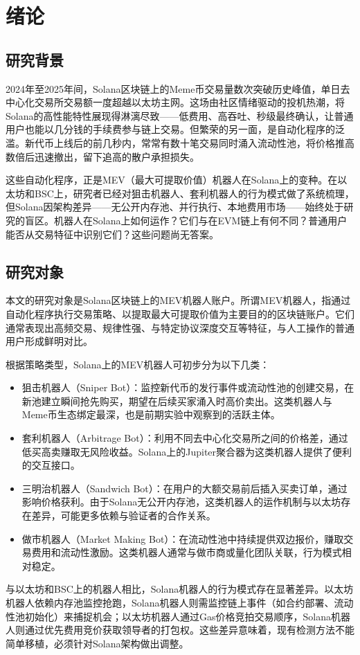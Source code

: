 \section{绪论}

\subsection{研究背景}

\par 2024年至2025年间，Solana区块链上的Meme币交易量数次突破历史峰值，单日去中心化交易所交易额一度超越以太坊主网。这场由社区情绪驱动的投机热潮，将Solana的高性能特性展现得淋漓尽致——低费用、高吞吐、秒级最终确认，让普通用户也能以几分钱的手续费参与链上交易。但繁荣的另一面，是自动化程序的泛滥。新代币上线后的前几秒内，常常有数十笔交易同时涌入流动性池，将价格推高数倍后迅速撤出，留下追高的散户承担损失。
\par 这些自动化程序，正是MEV（最大可提取价值）机器人在Solana上的变种。在以太坊和BSC上，研究者已经对狙击机器人、套利机器人的行为模式做了系统梳理，但Solana因架构差异——无公开内存池、并行执行、本地费用市场——始终处于研究的盲区。机器人在Solana上如何运作？它们与在EVM链上有何不同？普通用户能否从交易特征中识别它们？这些问题尚无答案。

\subsection{研究对象}

\par 本文的研究对象是Solana区块链上的MEV机器人账户。所谓MEV机器人，指通过自动化程序执行交易策略、以提取最大可提取价值为主要目的的区块链账户。它们通常表现出高频交易、规律性强、与特定协议深度交互等特征，与人工操作的普通用户形成鲜明对比。
\par 根据策略类型，Solana上的MEV机器人可初步分为以下几类：
\begin{itemize}
    \item 狙击机器人（Sniper Bot）：监控新代币的发行事件或流动性池的创建交易，在新池建立瞬间抢先购买，期望在后续买家涌入时高价卖出。这类机器人与Meme币生态绑定最深，也是前期实验中观察到的活跃主体。
    \item 套利机器人（Arbitrage Bot）：利用不同去中心化交易所之间的价格差，通过低买高卖赚取无风险收益。Solana上的Jupiter聚合器为这类机器人提供了便利的交互接口。
    \item 三明治机器人（Sandwich Bot）：在用户的大额交易前后插入买卖订单，通过影响价格获利。由于Solana无公开内存池，这类机器人的运作机制与以太坊存在差异，可能更多依赖与验证者的合作关系。
    \item 做市机器人（Market Making Bot）：在流动性池中持续提供双边报价，赚取交易费用和流动性激励。这类机器人通常与做市商或量化团队关联，行为模式相对稳定。
\end{itemize}
\par 与以太坊和BSC上的机器人相比，Solana机器人的行为模式存在显著差异。以太坊机器人依赖内存池监控抢跑，Solana机器人则需监控链上事件（如合约部署、流动性池初始化）来捕捉机会；以太坊机器人通过Gas价格竞拍交易顺序，Solana机器人则通过优先费用竞价获取领导者的打包权。这些差异意味着，现有检测方法不能简单移植，必须针对Solana架构做出调整。

